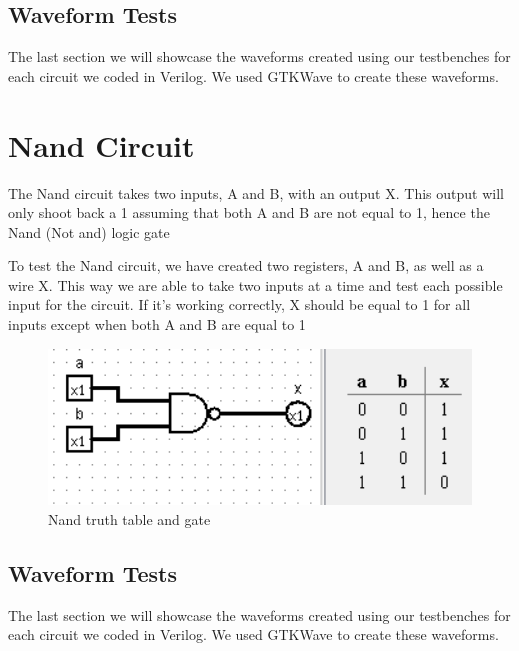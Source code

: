 \documentclass[12pt]{article}
\begin{document}
\newpage



\subsection{Waveform Tests}

The last section we will showcase the waveforms created using our testbenches for each circuit we coded in Verilog. We used GTKWave to create these waveforms.



\section{Nand Circuit}
The Nand circuit takes two inputs, A and B, with an output X. This output will only shoot back a 1 assuming that both A and B are not equal to 1, hence the Nand (Not and) logic gate


To test the Nand circuit, we have created two registers, A and B, as well as a wire X. This way we are able to take two inputs at a time and test each possible input for the circuit. If it's working correctly, X should be equal to 1 for all inputs except when both A and B are equal to 1


\begin{figure}[h]
    \centering
    \includegraphics[width = 1.0\textwidth]{figs/Nand CircuitTruth.png}
    \caption{Nand truth table and gate}
    \label{fig:enter-label}
\end{figure}

\newpage

\subsection{Waveform Tests}

The last section we will showcase the waveforms created using our testbenches for each circuit we coded in Verilog. We used GTKWave to create these waveforms.
\end{document}
